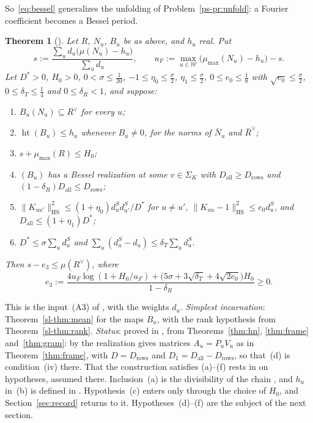 \documentclass[reqno]{amsart}
\theoremstyle{definition}
\theoremstyle{plain}
\newtheorem{theorem}{Theorem}[section]
\newcommand{\Wc}{\mathcal{W}}
\newcommand{\mumax}{\mu_{\max}}
\newcommand{\hgt}{\operatorname{ht}}
\newcommand{\HS}{\mathrm{HS}}
\newcommand{\Dall}{D_{\mathrm{all}}}
\newcommand{\Drows}{D_{\mathrm{rows}}}
\newcommand{\dS}{d^{S}}
\begin{document}
So~\eqref{eq:bessel} generalizes the unfolding of Problem~\ref{ps-pr:unfold}: a Fourier coefficient becomes a Bessel period.

\begin{theorem}[{\cite[Thm.~13.15]{Adr}}]\label{thm:A3}
Let \(R\), \(N_u\), \(B_u\) be as above, and \(h_u\) real.  Put
\[
  s := \frac{\sum_u d_u\bigl(\mu(N_u) - h_u\bigr)}{\sum_u d_u} , \qquad u_F := \max_{u \in \Wc}\bigl(\mumax(N_u) - h_u\bigr) - s .
\]
Let \(D^* > 0\), \(H_0 > 0\), \(0 < \sigma \le \frac1{20}\), \(-1 \le \eta_0 \le \frac\sigma2\), \(\eta_1 \le \frac\sigma2\), \(0 \le e_0 \le \frac18\) with \(\sqrt{e_0} \le \frac\sigma2\), \(0 \le \delta_T \le \frac14\) and \(0 \le \delta_R < 1\), and suppose:
\begin{enumerate}
\item[(a)] \(B_u(N_u) \subseteq R^\vee\) for every \(u\);
\item[(b)] \(\hgt(B_u) \le h_u\) whenever \(B_u \ne 0\), for the norms of \(\bar N_u\) and \(\bar R^\vee\);
\item[(c)] \(s + \mumax(R) \le H_0\);
\item[(d)] \((B_u)\) has a Bessel realization at some \(v \in \Sigma_K\) with \(\Dall \ge \Drows\) and \((1 - \delta_R)\Dall \le \Drows\);
\item[(e)] \(\lVert K_{uu'}\rVert_\HS^2 \le (1 + \eta_0)\dS_u\dS_{u'}/D^*\) for \(u \ne u'\), \(\lVert K_{uu} - 1\rVert_\HS^2 \le e_0\dS_u\), and \(\Dall \le (1 + \eta_1)D^*\);
\item[(f)] \(D^* \le \sigma\sum_u \dS_u\) and \(\sum_u (\dS_u - d_u) \le \delta_T\sum_u \dS_u\).
\end{enumerate}
Then \(s - e_3 \le \mu(R^\vee)\), where
\[
  e_3 := \frac{4u_F\log(1 + H_0/u_F) + \bigl(5\sigma + 3\sqrt{\delta_T} + 4\sqrt{2e_0}\bigr)H_0}{1 - \delta_R} \ge 0 .
\]
\end{theorem}

This is the input~(A3) of \cite[Prop.~3.1]{Adr}, with the weights \(d_u\).  \emph{Simplest incarnation}: Theorem~\ref{sl-thm:mean} for the maps \(B_u\), with the rank hypothesis from Theorem~\ref{sl-thm:rank}.  \emph{Status}: proved in \cite{Adr}, from Theorems~\ref{thm:hn}, \ref{thm:frame} and~\ref{thm:gram}: by \cite[Lemma~13.14]{Adr} the realization gives matrices \(A_u = P_uV_u\) as in Theorem~\ref{thm:frame}, with \(D = \Drows\) and \(D_1 = \Dall - \Drows\), so that~(d) is condition~(iv) there.  That the construction satisfies (a)--(f) rests in \cite{Adr} on hypotheses, assumed there.  Inclusion~(a) is the divisibility of the chain \cite[\S\S11--12, Lemma~13.20]{Adr}, and \(h_u\) in~(b) is defined in \cite[Def.~15.14]{Adr}.  Hypothesis~(c) enters only through the choice of \(H_0\), and Section~\ref{sec:record} returns to it.  Hypotheses~(d)--(f) are the subject of the next section.
\end{document}
